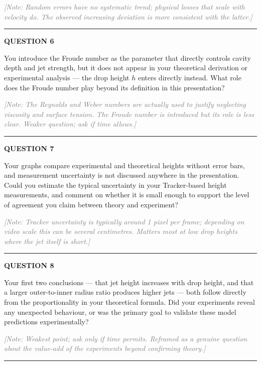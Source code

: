 \documentclass[a4paper,11pt]{article}
\newcommand{\qtitle}[1]{{\small\textbf{QUESTION #1}}\par\smallskip}
\newcommand{\qdivider}{\vspace{0.7em}\noindent\rule{\textwidth}{0.4pt}\vspace{0.7em}}
\begin{document}
\medskip
\noindent\textcolor{gray}{\small\itshape [Note: Random errors have no systematic trend; physical losses that scale with velocity do. The observed increasing deviation is more consistent with the latter.]}

\qdivider

\qtitle{6}
You introduce the Froude number as the parameter that directly controls cavity depth and jet strength, but it does not appear in your theoretical derivation or experimental analysis --- the drop height $h$ enters directly instead. What role does the Froude number play beyond its definition in this presentation?

\medskip
\noindent\textcolor{gray}{\small\itshape [Note: The Reynolds and Weber numbers are actually used to justify neglecting viscosity and surface tension. The Froude number is introduced but its role is less clear. Weaker question; ask if time allows.]}

\qdivider

\qtitle{7}
Your graphs compare experimental and theoretical heights without error bars, and measurement uncertainty is not discussed anywhere in the presentation. Could you estimate the typical uncertainty in your Tracker-based height measurements, and comment on whether it is small enough to support the level of agreement you claim between theory and experiment?

\medskip
\noindent\textcolor{gray}{\small\itshape [Note: Tracker uncertainty is typically around 1 pixel per frame; depending on video scale this can be several centimetres. Matters most at low drop heights where the jet itself is short.]}

\qdivider

\qtitle{8}
Your first two conclusions --- that jet height increases with drop height, and that a larger outer-to-inner radius ratio produces higher jets --- both follow directly from the proportionality in your theoretical formula. Did your experiments reveal any unexpected behaviour, or was the primary goal to validate these model predictions experimentally?

\medskip
\noindent\textcolor{gray}{\small\itshape [Note: Weakest point; ask only if time permits. Reframed as a genuine question about the value-add of the experiments beyond confirming theory.]}

\qdivider
\end{document}
